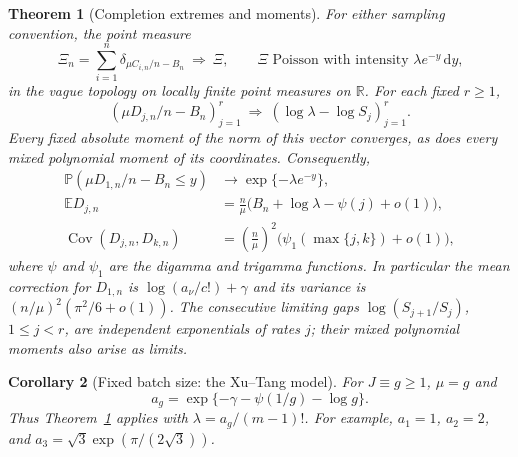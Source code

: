 \documentclass[11pt]{article}
\newtheorem{theorem}{Theorem}[section]
\newtheorem{corollary}[theorem]{Corollary}
\theoremstyle{remark}\newtheorem{remark}[theorem]{Remark}
\newcommand{\Pbb}{\mathbb P}
\newcommand{\Ebb}{\mathbb E}
\newcommand{\Cov}{\operatorname{Cov}}
\newcommand{\Rbb}{\mathbb R}
\newcommand{\dd}{\,\mathrm d}
\begin{document}
\begin{theorem}[Completion extremes and moments]\label{thm:main}
For either sampling convention, the point measure
\begin{equation}\label{eq:ppp}
 \Xi_n=\sum_{i=1}^n\delta_{\mu C_{i,n}/n-B_n}
 \ \Longrightarrow\ \Xi,
 \qquad \text{$\Xi$ Poisson with intensity $\lambda e^{-y}\dd y$,}
\end{equation}
in the vague topology on locally finite point measures on $\Rbb$.
For each fixed $r\ge1$,
\begin{equation}\label{eq:order}
 (\mu D_{j,n}/n-B_n)_{j=1}^r
 \ \Longrightarrow\ (\log\lambda-\log S_j)_{j=1}^r.
\end{equation}
Every fixed absolute moment of the norm of this vector converges, as does
every mixed polynomial moment of its coordinates. Consequently,
\begin{align}
 \Pbb(\mu D_{1,n}/n-B_n\le y)&\longrightarrow
       \exp\{-\lambda e^{-y}\},\label{eq:gumbel}\\
 \Ebb D_{j,n}&=\frac n\mu\bigl(B_n+\log\lambda-\psi(j)+o(1)\bigr),
       \label{eq:mean}\\
 \Cov(D_{j,n},D_{k,n})&=\left(\frac n\mu\right)^2
       \bigl(\psi_1(\max\{j,k\})+o(1)\bigr),\label{eq:cov}
\end{align}
where $\psi$ and $\psi_1$ are the digamma and trigamma functions.
In particular the mean correction for $D_{1,n}$ is
$\log(a_\nu/c!)+\gamma$ and its variance is
$(n/\mu)^2(\pi^2/6+o(1))$.
The consecutive limiting gaps $\log(S_{j+1}/S_j)$, $1\le j<r$, are independent
exponentials of rates $j$; their mixed polynomial moments also arise as limits.
\end{theorem}

\begin{corollary}[Fixed batch size: the Xu--Tang model]\label{cor:xt}
For $J\equiv g\ge1$, $\mu=g$ and
\begin{equation}\label{eq:ag}
 a_g=\exp\{-\gamma-\psi(1/g)-\log g\}.
\end{equation}
Thus Theorem~\ref{thm:main} applies with $\lambda=a_g/(m-1)!$.
For example, $a_1=1$, $a_2=2$, and
$a_3=\sqrt3\exp(\pi/(2\sqrt3))$.
\end{corollary}
\end{document}
